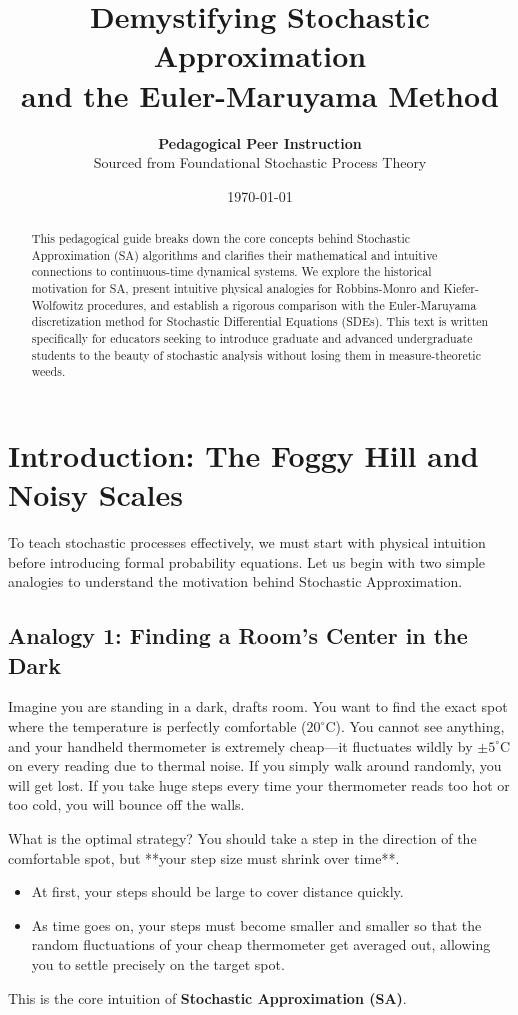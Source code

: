 \documentclass[11pt]{article}
\title{\textbf{Demystifying Stochastic Approximation \\ and the Euler-Maruyama Method}}
\author{\textbf{Pedagogical Peer Instruction} \\ Sourced from Foundational Stochastic Process Theory}
\date{\today}
\begin{document}
\maketitle

\begin{abstract}
This pedagogical guide breaks down the core concepts behind Stochastic Approximation (SA) algorithms and clarifies their mathematical and intuitive connections to continuous-time dynamical systems. We explore the historical motivation for SA, present intuitive physical analogies for Robbins-Monro and Kiefer-Wolfowitz procedures, and establish a rigorous comparison with the Euler-Maruyama discretization method for Stochastic Differential Equations (SDEs). This text is written specifically for educators seeking to introduce graduate and advanced undergraduate students to the beauty of stochastic analysis without losing them in measure-theoretic weeds.
\end{abstract}

\section{Introduction: The Foggy Hill and Noisy Scales}

To teach stochastic processes effectively, we must start with physical intuition before introducing formal probability equations. Let us begin with two simple analogies to understand the motivation behind Stochastic Approximation.

\subsection{Analogy 1: Finding a Room's Center in the Dark}
Imagine you are standing in a dark, drafts room. You want to find the exact spot where the temperature is perfectly comfortable ($20^\circ\text{C}$). You cannot see anything, and your handheld thermometer is extremely cheap—it fluctuates wildly by $\pm 5^\circ\text{C}$ on every reading due to thermal noise.
If you simply walk around randomly, you will get lost. If you take huge steps every time your thermometer reads too hot or too cold, you will bounce off the walls. 

What is the optimal strategy? You should take a step in the direction of the comfortable spot, but **your step size must shrink over time**. 
\begin{itemize}
    \item At first, your steps should be large to cover distance quickly.
    \item As time goes on, your steps must become smaller and smaller so that the random fluctuations of your cheap thermometer get averaged out, allowing you to settle precisely on the target spot.
\end{itemize}
This is the core intuition of \textbf{Stochastic Approximation (SA)}.
\end{document}
